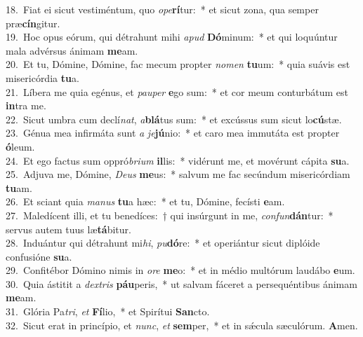 {18.~}Fiat ei sicut vestiméntum, quo \textit{o}\textit{pe}\textbf{rí}tur:~* et sicut zona, qua semper præ\textbf{cín}gitur.\\
{19.~}Hoc opus eórum, qui détrahunt mihi \textit{a}\textit{pud} \textbf{Dó}minum:~* et qui loquúntur mala advérsus ánimam \textbf{me}am.\\
{20.~}Et tu, Dómine, Dómine, fac mecum propter \textit{no}\textit{men} \textbf{tu}um:~* quia suávis est misericórdia \textbf{tu}a.\\
{21.~}Líbera me quia egénus, et \textit{pau}\textit{per} \textbf{e}go sum:~* et cor meum conturbátum est \textbf{in}tra me.\\
{22.~}Sicut umbra cum declí\textit{nat}, \textit{a}\textbf{blá}tus sum:~* et excússus sum sicut lo\textbf{cú}stæ.\\
{23.~}Génua mea infirmáta sunt \textit{a} \textit{je}\textbf{jú}nio:~* et caro mea immutáta est propter \textbf{ó}leum.\\
{24.~}Et ego factus sum oppró\textit{bri}\textit{um} \textbf{il}lis:~* vidérunt me, et movérunt cápita \textbf{su}a.\\
{25.~}Adjuva me, Dómine, \textit{De}\textit{us} \textbf{me}us:~* salvum me fac secúndum misericórdiam \textbf{tu}am.\\
{26.~}Et sciant quia \textit{ma}\textit{nus} \textbf{tu}a hæc:~* et tu, Dómine, fecísti \textbf{e}am.\\
{27.~}Maledícent illi, et tu benedíces:~† qui insúrgunt in me, \textit{con}\textit{fun}\textbf{dán}tur:~* servus autem tuus læ\textbf{tá}bitur.\\
{28.~}Induántur qui détrahunt mi\textit{hi}, \textit{pu}\textbf{dó}re:~* et operiántur sicut diplóide confusióne \textbf{su}a.\\
{29.~}Confitébor Dómino nimis in \textit{o}\textit{re} \textbf{me}o:~* et in médio multórum laudábo \textbf{e}um.\\
{30.~}Quia ástitit a \textit{dex}\textit{tris} \textbf{páu}peris,~* ut salvam fáceret a persequéntibus ánimam \textbf{me}am.\\
{31.~}Glória Pa\textit{tri}, \textit{et} \textbf{Fí}lio,~* et Spirítui \textbf{San}cto.\\
{32.~}Sicut erat in princípio, et \textit{nunc}, \textit{et} \textbf{sem}per,~* et in sǽcula sæculórum. \textbf{A}men.\\
